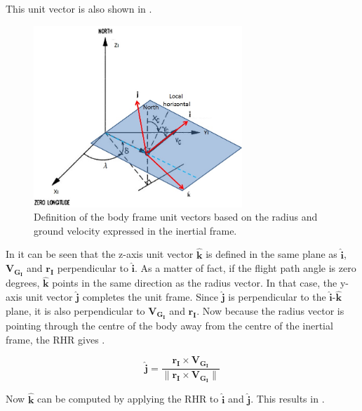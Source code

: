 This unit vector is also shown in .

 \begin{figure}[!ht]
\centering
\includegraphics[width=0.7\textwidth]{figures/reference_frames/cartesian_transformation_mooij1994motion.jpg}
\caption{Definition of the body frame unit vectors based on the radius and ground velocity expressed in the inertial frame. \citep{mooij1994motion}}
\label{fig:cartesian_transformation_mooij1994motion}
\end{figure}

In  it can be seen that the z-axis unit vector $\mathbf{\hat{k}}$ is defined in the same plane as $\mathbf{\hat{i}}$, $\mathbf{V_{G_{I}}}$ and $\mathbf{r_{I}}$ perpendicular to $\mathbf{\hat{i}}$. As a matter of fact, if the flight path angle is zero degrees, $\mathbf{\hat{k}}$ points in the same direction as the radius vector. In that case, the y-axis unit vector $\mathbf{\hat{j}}$ completes the unit frame. Since $\mathbf{\hat{j}}$ is perpendicular to the $\mathbf{\hat{i}}$-$\mathbf{\hat{k}}$ plane, it is also perpendicular to $\mathbf{V_{G_{I}}}$ and $\mathbf{r_{I}}$. Now because the radius vector is pointing through the centre of the body away from the centre of the inertial frame, the \ac{RHR} gives .


\begin{equation} \label{eq:jHat}
\mathbf{\hat{j}} = \dfrac{\mathbf{r_{I} \times \mathbf{V_{G_{I}}}}}{\| \mathbf{r_{I} \times \mathbf{V_{G_{I}}}} \|}
\end{equation}

Now $\mathbf{\hat{k}}$ can be computed by applying the \ac{RHR} to $\mathbf{\hat{i}}$ and $\mathbf{\hat{j}}$. This results in .

